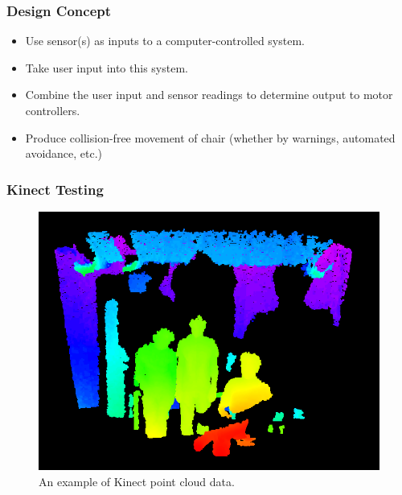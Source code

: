 \documentclass{beamer}
\begin{document}
\begin{frame}
  \frametitle{Design Concept}
  \begin{itemize}
    \item Use sensor(s) as inputs to a computer-controlled system. \\
    \item Take user input into this system. \\
    \item Combine the user input and sensor readings to determine output to motor controllers. \\
    \item Produce collision-free movement of chair (whether by warnings, automated avoidance, etc.) \\
  \end{itemize}
\end{frame}

\begin{frame}
 \frametitle{Kinect Testing}
 \begin{figure}
  \centering
  \includegraphics[scale=0.4]{group_pointcloud.png}
  \caption{An example of Kinect point cloud data.}
 \end{figure}
\end{frame}
\end{document}
